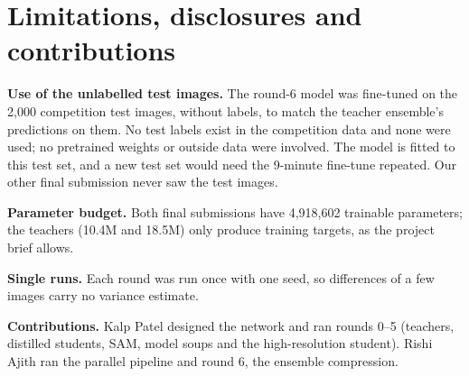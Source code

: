 \documentclass[11pt]{article}
\begin{document}
\section{Limitations, disclosures and contributions}
\textbf{Use of the unlabelled test images.} The round-6 model was fine-tuned on the 2,000 competition test images, without labels, to match the teacher ensemble's predictions on them. No test labels exist in the competition data and none were used; no pretrained weights or outside data were involved. The model is fitted to this test set, and a new test set would need the 9-minute fine-tune repeated. Our other final submission never saw the test images.

\textbf{Parameter budget.} Both final submissions have 4,918,602 trainable parameters; the teachers (10.4M and 18.5M) only produce training targets, as the project brief allows.

\textbf{Single runs.} Each round was run once with one seed, so differences of a few images carry no variance estimate.

\textbf{Contributions.} Kalp Patel designed the network and ran rounds 0--5 (teachers, distilled students, SAM, model soups and the high-resolution student). Rishi Ajith ran the parallel pipeline and round 6, the ensemble compression.
\end{document}

